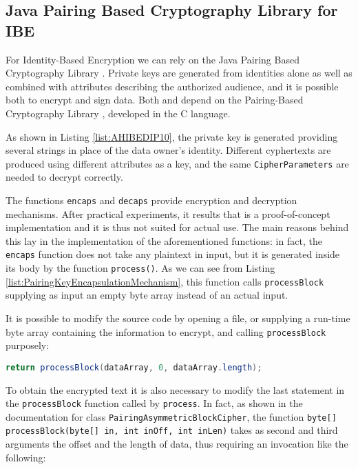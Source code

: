 \subsection{Java Pairing Based Cryptography Library for IBE}
For Identity-Based Encryption we can rely on the Java Pairing Based Cryptography Library \cite{ISCC:DecIov11}. Private keys are generated from identities alone as well as combined with attributes describing the authorized audience, and it is possible both to encrypt and sign data. Both \cite{ISCC:DecIov11} and \cite{bethencourt2011library} depend on the Pairing-Based Cryptography Library \cite{PBC2007Lynn}, developed in the C language.



As shown in Listing \ref{list:AHIBEDIP10}, the private key is generated providing several strings in place of the data owner's identity. Different cyphertexts are produced using different attributes as a key, and the same \texttt{CipherParameters} are needed to decrypt correctly.

The functions \texttt{encaps} and \texttt{decaps} provide encryption and decryption mechanisms. After practical experiments, it results that \cite{ISCC:DecIov11} is a proof-of-concept implementation and it is thus not suited for actual use. The main reasons behind this lay in the implementation of the aforementioned functions: in fact, the \texttt{encaps} function does not take any plaintext in input, but it is generated inside its body by the function \texttt{process()}. As we can see from Listing \ref{list:PairingKeyEncapsulationMechanism}, this function calls \texttt{processBlock} supplying as input an empty byte array instead of an actual input.



It is possible to modify the source code by opening a file, or supplying a run-time byte array containing the information to encrypt, and calling \texttt{processBlock} purposely:

\lstinline[language=java]!return processBlock(dataArray, 0, dataArray.length);!

To obtain the encrypted text it is also necessary to modify the last statement in the \texttt{processBlock} function called by \texttt{process}. In fact, as shown in the documentation for class \texttt{PairingAsymmetricBlockCipher}, the function \texttt{byte[] processBlock(byte[] in, int inOff, int inLen)} takes as second and third arguments the offset and the length of data, thus requiring an invocation like the following:

